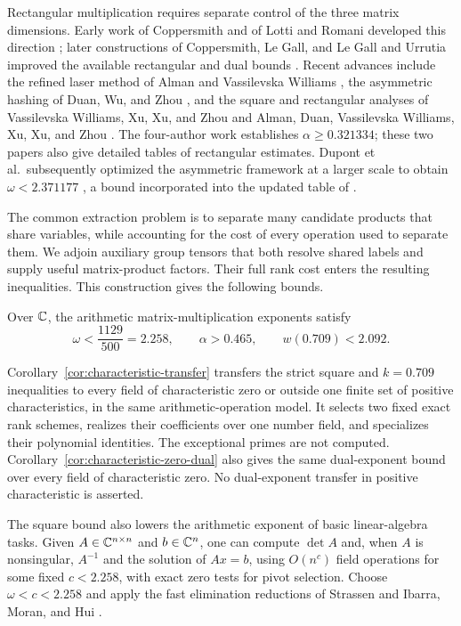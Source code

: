 Rectangular multiplication requires separate control of the three
matrix dimensions.  Early work of Coppersmith and of Lotti and Romani
developed this direction \cite{coppersmith1982,lottiromani1983}; later
constructions of Coppersmith, Le Gall, and Le Gall and Urrutia improved
the available rectangular and dual bounds
\cite{coppersmith-rect,legall-rect,legall-urrutia}.
Recent advances include the refined laser method of Alman and
Vassilevska Williams \cite{alman-williams}, the asymmetric hashing of
Duan, Wu, and Zhou \cite{duan-wu-zhou}, and the square and rectangular
analyses of Vassilevska Williams, Xu, Xu, and Zhou \cite{vxxz} and
Alman, Duan, Vassilevska Williams, Xu, Xu, and Zhou \cite{advxxz}.
The four-author work establishes \(\alpha\ge0.321334\); these two
papers also give detailed tables of rectangular estimates.
Dupont et al.\ subsequently optimized the asymmetric framework at
a larger scale to obtain \(\omega<2.371177\)
\cite{dupont}, a bound incorporated into the updated table of
\cite{advxxz}.

The common extraction problem is to separate many candidate products
that share variables, while accounting for the cost of every operation
used to separate them.  We adjoin auxiliary group tensors that both
resolve shared labels and supply useful matrix-product factors.  Their
full rank cost enters the resulting inequalities.  This construction
gives the following bounds.

\begin{theorem}\label{thm:main}\label{thm:square}\label{thm:rectangular}
Over \(\mathbb C\), the arithmetic matrix-multiplication exponents satisfy
\[
 \omega<\frac{1129}{500}=2.258,\qquad
 \alpha>0.465,\qquad w(0.709)<2.092.
\]
\end{theorem}

Corollary~\ref{cor:characteristic-transfer} transfers the strict square
and \(k=0.709\) inequalities to every field of characteristic zero or
outside one finite set of positive characteristics, in the same
arithmetic-operation model.  It selects two fixed exact rank schemes,
realizes their coefficients over one number field, and specializes
their polynomial identities.  The exceptional primes are not computed.
Corollary~\ref{cor:characteristic-zero-dual} also gives the same
dual-exponent bound over every field of characteristic zero.
No dual-exponent transfer in positive characteristic is asserted.

The square bound also lowers the arithmetic exponent of basic
linear-algebra tasks.  Given \(A\in\mathbb C^{n\times n}\) and
\(b\in\mathbb C^n\), one can compute \(\det A\) and, when \(A\) is
nonsingular, \(A^{-1}\) and the solution of \(Ax=b\), using
\(O(n^c)\) field operations for some fixed \(c<2.258\), with exact
zero tests for pivot selection.  Choose \(\omega<c<2.258\) and apply
the fast elimination reductions of Strassen \cite{strassen} and
Ibarra, Moran, and Hui
\cite[Theorem~2.1 and Corollary~2.1]{ibarra-moran-hui}.

